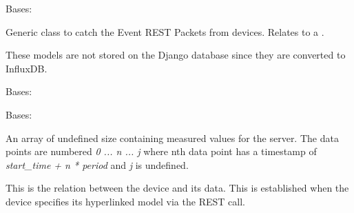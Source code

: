 \documentclass[letterpaper,10pt,english]{sphinxmanual}
\begin{document}

\begin{fulllineitems}
\label{modules/microdata:microdata.models.Event}
Bases: 

Generic class to catch the Event REST Packets from devices. Relates to a {\hyperref[modules/microdata:microdata.models.Device]{\emph{}}}.

These models are not stored on the Django database since they are converted to InfluxDB.

\begin{fulllineitems}
\label{modules/microdata:microdata.models.Event.DoesNotExist}
Bases: 

\end{fulllineitems}


\begin{fulllineitems}
\label{modules/microdata:microdata.models.Event.MultipleObjectsReturned}
Bases: 

\end{fulllineitems}


\begin{fulllineitems}
\label{modules/microdata:microdata.models.Event.dataPoints}
An array of undefined size containing measured values for the server. The data points are numbered \emph{0 ... n ... j} where nth data point has a timestamp of \emph{start\_time + n * period} and \emph{j} is undefined.

\end{fulllineitems}


\begin{fulllineitems}
\label{modules/microdata:microdata.models.Event.device}
This is the relation between the device and its data. This is established when the device specifies its hyperlinked model via the REST call.


\end{fulllineitems}
\end{fulllineitems}
\end{document}
